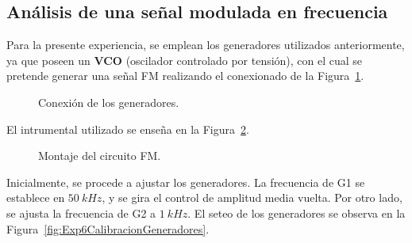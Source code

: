   \subsection{Análisis de una señal modulada en frecuencia}

    Para la presente experiencia, se emplean los generadores utilizados anteriormente, 
    ya que poseen un \textbf{VCO} (oscilador controlado por tensión), con el 
    cual se pretende generar una señal FM realizando el conexionado de la 
    Figura~\ref{fig:Exp6EsquemaGeneradores}. 

      \begin{figure}[H]
        \centering
          \caption{Conexión de los generadores.}
          \label{fig:Exp6EsquemaGeneradores}
      \end{figure}

    El intrumental utilizado se enseña en la Figura~\ref{fig:Exp6Montaje}.

      \begin{figure}[H]
        \centering
          \caption{Montaje del circuito FM.}
          \label{fig:Exp6Montaje}
      \end{figure}    
    
    
    Inicialmente, se procede a ajustar los generadores. La frecuencia de G1 se establece en 
    $50~kHz$, y se gira el control de amplitud media vuelta. Por otro lado, se ajusta la 
    frecuencia de G2 a $1~kHz$. El seteo de los generadores se observa en la 
    Figura~\ref{fig:Exp6CalibracionGeneradores}.

